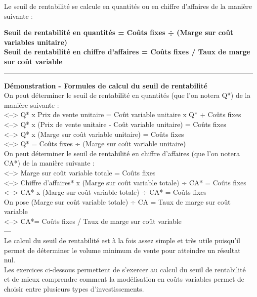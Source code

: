 \documentclass{kaobook}
\begin{document}
Le seuil de rentabilité se calcule en quantités ou en chiffre d'affaires de la manière suivante :\\
\begin{center}
\textbf{Seuil de rentabilité en quantités  =  Coûts fixes ÷ (Marge sur coût variables unitaire)}\\
\textbf{Seuil de rentabilité en chiffre d'affaires = Coûts fixes / Taux de marge sur coût variable}\\
\end{center}

\noindent\rule{\textwidth}{0.5pt}
\textbf{Démonstration -  Formules de calcul du seuil de rentabilité}\\
On peut déterminer le seuil de rentabilité en quantités (que l'on notera Q*) de la manière suivante :\\
<--> Q* x Prix de vente unitaire = Coût variable unitaire x Q* + Coûts fixes\\
<--> Q* x (Prix de vente unitaire - Coût variable unitaire) =  Coûts fixes\\
<--> Q* x (Marge sur coût variable unitaire) =  Coûts fixes\\
<--> Q* =  Coûts fixes ÷ (Marge sur coût variable unitaire)\\
On peut déterminer le seuil de rentabilité en chiffre d'affaires (que l'on notera CA*) de la manière suivante :\\
<--> Marge sur coût variable totale =  Coûts fixes\\
<--> Chiffre d'affaires* x (Marge sur coût variable totale) ÷ CA* =  Coûts fixes\\
<--> CA* x (Marge sur coût variable totale) ÷ CA* =  Coûts fixes\\
On pose (Marge sur coût variable totale) ÷ CA = Taux de marge sur coût variable\\
<--> CA*= Coûts fixes / Taux de marge sur coût variable\\
---\\

Le calcul du seuil de rentabilité est à la fois assez simple et très utile puisqu'il permet de déterminer le volume minimum de vente pour atteindre un résultat nul.\\

Les exercices ci-dessous permettent de s'exercer au calcul du seuil de rentabilité et de mieux comprendre comment la modélisation en coûts variables permet de choisir entre plusieurs types d'investissements.\\
\end{document}
